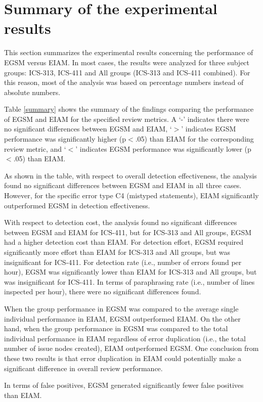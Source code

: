\section{Summary of the experimental results}
\label{sec:overview}

This section summarizes the experimental results
concerning the performance of EGSM versus EIAM. In most cases,
the results were analyzed for three subject groups: ICS-313, ICS-411
and All groups (ICS-313 and ICS-411 combined). For this reason, most
of the analysis was based on percentage numbers instead of 
absolute numbers.

Table \ref{summary} shows the summary of the findings comparing the
performance of EGSM and EIAM for the specified review metrics. A
`-' indicates there were no significant differences between
EGSM and EIAM, `$>$' indicates EGSM performance was
significantly higher (p$<$.05) than EIAM for the corresponding review
metric, and `$<$' indicates EGSM performance was significantly lower
(p$<$.05) than EIAM.


As shown in the table, with respect to overall
detection effectiveness, the analysis found no significant differences
between EGSM and EIAM in all three cases.  
However, for the specific error type C4 
(mistyped statements), EIAM significantly outperformed EGSM in
detection effectiveness.

With respect to detection cost, the analysis found no significant
differences between EGSM and EIAM for ICS-411, but for ICS-313 and All 
groups, EGSM had a higher detection cost than EIAM.
For detection effort, EGSM required significantly more effort than EIAM
for ICS-313 and All groups, but was insignificant for ICS-411. For
detection rate (i.e., number of errors found per hour), EGSM was
significantly lower than EIAM for ICS-313 and All groups, but was
insignificant for ICS-411.
In terms of paraphrasing rate (i.e., number of lines inspected per
hour), there were no significant differences found.

When the group performance in EGSM was compared to the average single
individual performance in EIAM, EGSM outperformed EIAM.
On the other hand, when the group performance in EGSM was compared to the
total individual performance in EIAM regardless of error duplication
(i.e., the total number of issue nodes created), EIAM outperformed EGSM. One
conclusion from these two results is that 
error duplication in EIAM could potentially make a significant
difference in overall review performance.

In terms of false positives, EGSM generated significantly
fewer false positives than EIAM.


